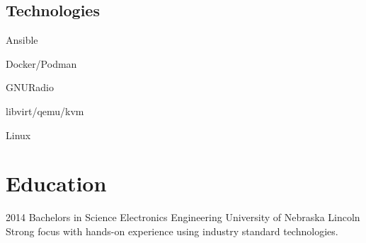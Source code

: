 \documentclass[]{src/friggeri-cv}
\begin{document}
\begin{aside}
  \section{Technologies}
    \item[\rightarrow]{Ansible}
    \item[\rightarrow]{Docker/Podman}
    \item[\rightarrow]{GNURadio}
    \item[\rightarrow]{libvirt/qemu/kvm}
    \item[\rightarrow]{Linux}
    ~
\end{aside}

\section{Education}
\begin{entrylist}
  \entry
    {2014}
    {Bachelors in Science Electronics Engineering}
    {University of Nebraska Lincoln}
    {Strong focus with hands-on experience using industry standard technologies.}
\end{entrylist}
\end{document}
